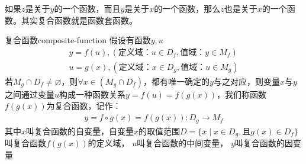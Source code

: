 如果$z$是关于$y$的一个函数，而且$y$是关于$x$的一个函数，那么$z$也是关于$x$的一个函数。其实复合函数就是函数套函数。

\begin{definition}{复合函数}{composite-function}
假设有函数$y, u$
\begin{eqnarray}
y=f(u), (\mbox{定义域：}u \in D_f, \mbox{值域：}y \in M_f) \\
u=g(x), (\mbox{定义域：}x \in D_g, \mbox{值域：}u \in M_g)
\end{eqnarray}
若$M_g \cap D_f \neq \varnothing$，则$\forall x \in \left( M_g \cap D_f \right)$，都有唯一确定的$y$与之对应，则变量$x$与$y$之间通过变量$u$构成一种函数关系$y = f(u) = f(g(x))$，我们称函数$f(g(x))$为\textcolor{third}{复合函数}，记作：
\begin{equation}
\begin{array}{l}
y = f \circ g(x) = f(g(x)): D_g \to M_f
\end{array}
\end{equation}
其中$x$叫复合函数的\textcolor{third}{自变量}，自变量$x$的取值范围$D=\{ x \mid x \in D_g, \mbox{且} g(x) \in D_f \}$叫复合函数$f(g(x))$的定义域， $u$叫复合函数的\textcolor{third}{中间变量}， $y$叫复合函数的\textcolor{third}{因变量}
\end{definition}

